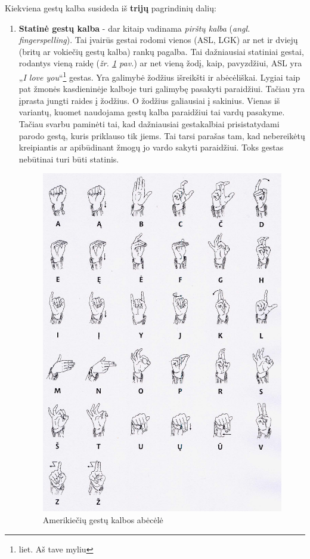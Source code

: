 \documentclass{VUMIFPSbakalaurinis}
\begin{document}
Kiekviena gestų kalba susideda iš \textbf{trijų} pagrindinių dalių:
\begin{enumerate}
	\item\textbf{Statinė gestų kalba} - dar kitaip vadinama \textit{pirštų kalba} (\textit{angl. fingerspelling}). Tai įvairūs gestai rodomi vienos (ASL, LGK) ar net ir dviejų (britų ar vokiečių gestų kalba) rankų pagalba. Tai dažniausiai statiniai gestai, rodantys vieną raidę (\textit{žr. \ref{img:lgk} pav.}) ar net vieną žodį, kaip, pavyzdžiui, ASL yra „\textit{I love you}“\footnote{liet. Aš tave myliu} gestas. Yra galimybė žodžius išreikšti ir abėcėliškai. Lygiai taip pat žmonės kasdieninėje kalboje turi galimybę pasakyti paraidžiui. Tačiau yra įprasta jungti raides į žodžius. O žodžius galiausiai į sakinius. Vienas iš variantų, kuomet naudojama gestų kalba paraidžiui tai vardų pasakyme. Tačiau svarbu paminėti tai, kad dažniausiai gestakalbiai prisistatydami parodo gestą, kuris priklauso tik jiems. Tai tarsi parašas tam, kad nebereikėtų kreipiantis ar apibūdinant žmogų jo vardo sakyti paraidžiui. Toks gestas nebūtinai turi būti statinis.
	
\begin{figure}[H]
    \centering
    \includegraphics[scale=0.4]{img/lgk}
    \caption{Amerikiečių gestų kalbos abėcėlė}
    \label{img:lgk}
\end{figure}


\end{enumerate}
\end{document}
